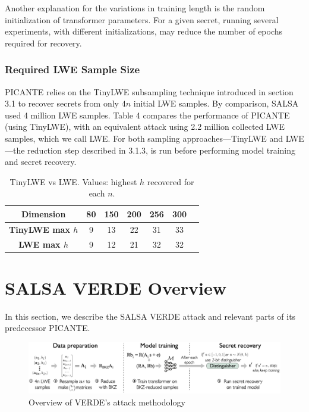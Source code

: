 \documentclass{article}
\begin{document}
Another explanation for the variations in training length is the random initialization of transformer parameters. For a given secret, running several experiments, with different initializations, may reduce the number of epochs required for recovery.

\subsubsection{Required LWE Sample Size}

PICANTE relies on the TinyLWE subsampling technique introduced in section 3.1 to recover secrets from only \(4n\) initial LWE samples. By comparison, SALSA used 4 million LWE samples. Table 4 compares the performance of PICANTE (using TinyLWE), with an equivalent attack using 2.2 million collected LWE samples, which we call LWE. For both sampling approaches—TinyLWE and LWE—the reduction step described in 3.1.3, is run before performing model training and secret recovery.

\begin{table}[h]
    \centering
    \begin{tabular}{|c|c|c|c|c|c|c|}
        \hline
        \textbf{Dimension} & \textbf{80} & \textbf{150} & \textbf{200} & \textbf{256} & \textbf{300} \\
        \hline
        \textbf{TinyLWE max \( h \)} & 9 & 13 & 22 & 31 & 33 \\
        \textbf{LWE max \( h \)} & 9 & 12 & 21 & 32 & 32 \\
        \hline
    \end{tabular}
    \caption{TinyLWE vs LWE. Values: highest \(h\) recovered for each \(n\).}
\end{table}

\section{SALSA VERDE Overview}

In this section, we describe the SALSA VERDE attack and relevant parts of its predecessor PICANTE.

\begin{figure}[h]
    \centering
    \includegraphics[width=\textwidth]{Materials/SALSA_VERDE_Attack_methodology.png}
    \caption{Overview of VERDE's attack methodology}
\end{figure}
\end{document}
